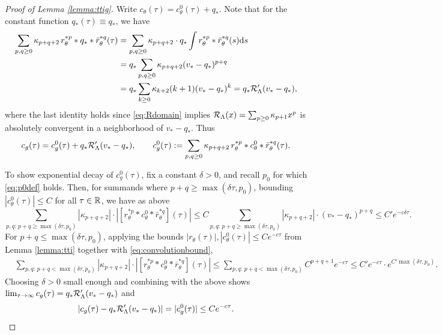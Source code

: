 \begin{proof}[Proof of Lemma \ref{lemma:ttig}]
Write $c_\theta(\tau)=c_\theta^0(\tau)+q_*$. Note that
for the constant function $q_*(\tau) \equiv q_*$, we have
\begin{align*}
\sum_{p,q \geq 0} \kappa_{p+q+2}\,r_\theta^{*p}
*q_* *\bar r_\theta^{*q}(\tau)
&=\sum_{p,q \geq 0} \kappa_{p+q+2}
\cdot q_*\int r_\theta^{*p}*\bar r_\theta^{*q}(s)\mathrm{d} s\\
&=q_*\sum_{p,q \geq 0} \kappa_{p+q+2}(v_*-q_*)^{p+q}\\
&=q_*\sum_{k \geq 0} \kappa_{k+2} (k+1)(v_*-q_*)^k
=q_*\mathcal{R}_\Lambda'(v_*-q_*),
\end{align*}
where the last identity holds since \eqref{eq:Rdomain} implies
$\mathcal{R}_\Lambda(x)=\sum_{p \geq 0} \kappa_{p+1} x^p$ is absolutely convergent in a
neighborhood of $v_*-q_*$. Thus
\[c_g(\tau)=c_g^0(\tau)+q_*\mathcal{R}_\Lambda'(v_*-q_*),
\qquad c_g^0(\tau):=\sum_{p,q \geq 0} \kappa_{p+q+2}\,r_\theta^{*p}
*c_\theta^0*\bar r_\theta^{*q}(\tau).\]

To show exponential decay of $c_g^0(\tau)$, fix a constant $\delta>0$,
and recall $p_0$ for which \eqref{eq:p0def} holds. Then, for summands where $p+q
\geq \max(\delta\tau,p_0)$,
bounding $|c_\theta^0(\tau)| \leq C$ for all $\tau \in \mathbb{R}$, we have as above
\[\sum_{p,q:\,p+q \geq \max(\delta\tau,p_0)}
|\kappa_{p+q+2}| \cdot |[r_\theta^{*p}*c_\theta^0
*\bar r_\theta^{*q}](\tau)|
\leq C\sum_{p,q:\,p+q \geq \max(\delta\tau,p_0)}
|\kappa_{p+q+2}| \cdot (v_*-q_*)^{p+q} \leq C'e^{-c\delta\tau}.\]
For $p+q \leq \max(\delta\tau,p_0)$, 
applying the bounds $|r_\theta(\tau)|,|c_\theta^0(\tau)| \leq Ce^{-c\tau}$ from
Lemma \ref{lemma:tti} together with \eqref{eq:convolutionbound},
\begin{align*}
&\sum_{p,q:\,p+q<\max(\delta\tau,p_0)}
|\kappa_{p+q+2}| \cdot |[r_\theta^{*p}*c_\theta^0 *\bar r_\theta^{*q}](\tau)|
\leq \sum_{p,q:\,p+q<\max(\delta\tau,p_0)}
C^{p+q+1}e^{-c\tau}
\leq C'e^{-c\tau} \cdot e^{C'\max(\delta\tau,p_0)}.
\end{align*}
Choosing $\delta>0$ small enough and combining with the above shows
$\lim_{\tau \to \infty} c_g(\tau)=q_*\mathcal{R}_\Lambda'(v_*-q_*)$ and
\[|c_g(\tau)-q_*\mathcal{R}_\Lambda'(v_*-q_*)|
=|c_g^0(\tau)| \leq Ce^{-c\tau}.\]


\end{proof}
